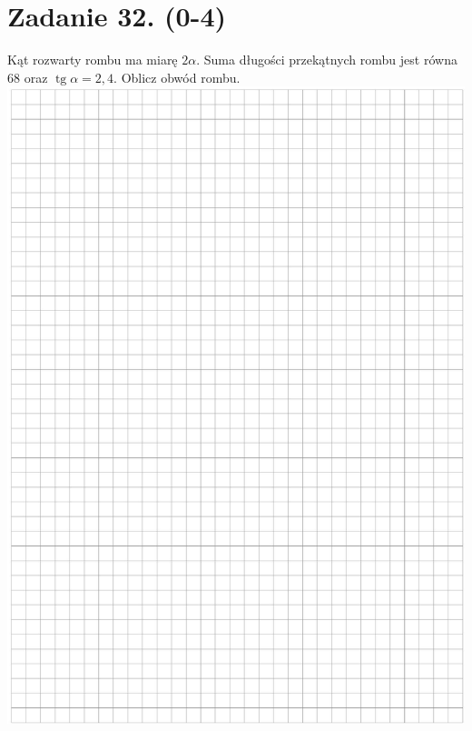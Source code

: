 \documentclass[10pt]{article}
\begin{document}
\section*{Zadanie 32. (0-4)}
Kąt rozwarty rombu ma miarę \(2 \alpha\). Suma długości przekątnych rombu jest równa 68 oraz \(\operatorname{tg} \alpha=2,4\). Oblicz obwód rombu.\\
\includegraphics[max width=\textwidth, center]{2024_11_21_99eb8e6624b497a5af43g-16}
\end{document}

